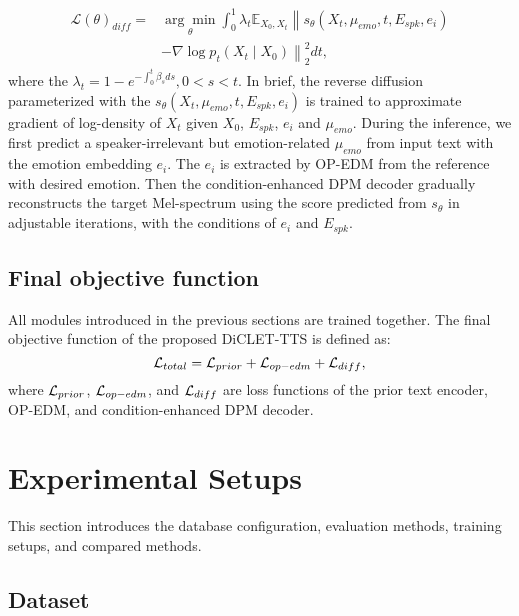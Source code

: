 \documentclass[journal,comsoc]{IEEEtran}
\begin{document}
\begin{equation}
\begin{aligned}
\mathcal{L}(\theta)_{diff}=&\underset{\theta}{\arg \min } \int_{0}^{1} \lambda_{t} \mathbb{E}_{X_{0}, X_{t}}\left\|s_{\theta}\left(X_{t}, \mu_{emo}, t, E_{spk}, e_{i}\right)
\right.\\ &\left.
-\nabla \log p_t\left(X_{t} \mid X_{0}\right)\right\|_{2}^{2} d t,
\end{aligned}
\end{equation}
where the $\lambda_{t} = 1-e^{-\int_{0}^{t} \beta_{s} ds}, 0<s<t$.
In brief, the reverse diffusion parameterized with the $s_{\theta}\left(X_{t}, \mu_{emo}, t, E_{spk}, e_{i}\right)$ is trained to approximate gradient of log-density of $X_{t}$ given $X_{0}$, $E_{spk}$, $e_{i}$ and $\mu_{emo}$. 
During the inference, we first predict a speaker-irrelevant but emotion-related $\mu_{emo}$ from input text with the emotion embedding $e_{i}$.
The $e_{i}$ is extracted by OP-EDM from the reference with desired emotion. 
Then the condition-enhanced DPM decoder gradually reconstructs the target Mel-spectrum using the score predicted from $s_{\theta}$ in adjustable iterations, with the conditions of $e_{i}$ and $E_{spk}$.


\vspace{-0.1cm}
\subsection{Final objective function}
All modules introduced in the previous sections are trained together. 
The final objective function of the proposed DiCLET-TTS is defined as:
\begin{equation}
    {{\cal L}_{total}} ={{\cal L}_{prior}} + {{\cal L}_{op-edm}} + {{\cal L}_{diff}},
\end{equation}
where ${\cal L}_{prior}$, ${\cal L}_{op-edm}$, and ${\cal L}_{diff}$ are loss functions of the prior text encoder, OP-EDM, and condition-enhanced DPM decoder. 

\vspace{-0.1cm}
\section{Experimental Setups}
\label{sc:experiments}

This section introduces the database configuration, evaluation methods, training setups, and compared methods.

\vspace{-0.2cm}
\subsection{Dataset} 
\label{sc:database}
\end{document}
